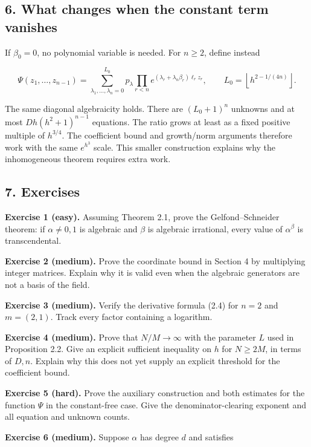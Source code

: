 \documentclass[
  11pt,
  a4paper,
]{article}
\begin{document}
\subsection{6. What changes when the constant term
vanishes}\label{what-changes-when-the-constant-term-vanishes}

If \(\beta_0=0\), no polynomial variable is needed. For \(n\ge2\),
define instead

\[
\Psi(z_1,\ldots,z_{n-1})
=\sum_{\lambda_1,\ldots,\lambda_n=0}^{L_0}
p_\lambda\prod_{r<n}e^{(\lambda_r+\lambda_n\beta_r)\ell_rz_r},
\qquad L_0=\left\lfloor h^{2-1/(4n)}\right\rfloor.
\]

The same diagonal algebraicity holds. There are \((L_0+1)^n\) unknowns
and at most \(D h(h^2+1)^{n-1}\) equations. The ratio grows at least as
a fixed positive multiple of \(h^{3/4}\). The coefficient bound and
growth/norm arguments therefore work with the same \(e^{h^3}\) scale.
This smaller construction explains why the inhomogeneous theorem
requires extra work.

\subsection{7. Exercises}\label{exercises}

\textbf{Exercise 1 (easy).} Assuming Theorem 2.1, prove the
Gelfond--Schneider theorem: if \(\alpha\ne0,1\) is algebraic and
\(\beta\) is algebraic irrational, every value of \(\alpha^\beta\) is
transcendental.

\textbf{Exercise 2 (medium).} Prove the coordinate bound in Section 4 by
multiplying integer matrices. Explain why it is valid even when the
algebraic generators are not a basis of the field.

\textbf{Exercise 3 (medium).} Verify the derivative formula (2.4) for
\(n=2\) and \(m=(2,1)\). Track every factor containing a logarithm.

\textbf{Exercise 4 (medium).} Prove that \(N/M\to\infty\) with the
parameter \(L\) used in Proposition 2.2. Give an explicit sufficient
inequality on \(h\) for \(N\ge2M\), in terms of \(D,n\). Explain why
this does not yet supply an explicit threshold for the coefficient
bound.

\textbf{Exercise 5 (hard).} Prove the auxiliary construction and both
estimates for the function \(\Psi\) in the constant-free case. Give the
denominator-clearing exponent and all equation and unknown counts.

\textbf{Exercise 6 (medium).} Suppose \(\alpha\) has degree \(d\) and
satisfies
\end{document}
